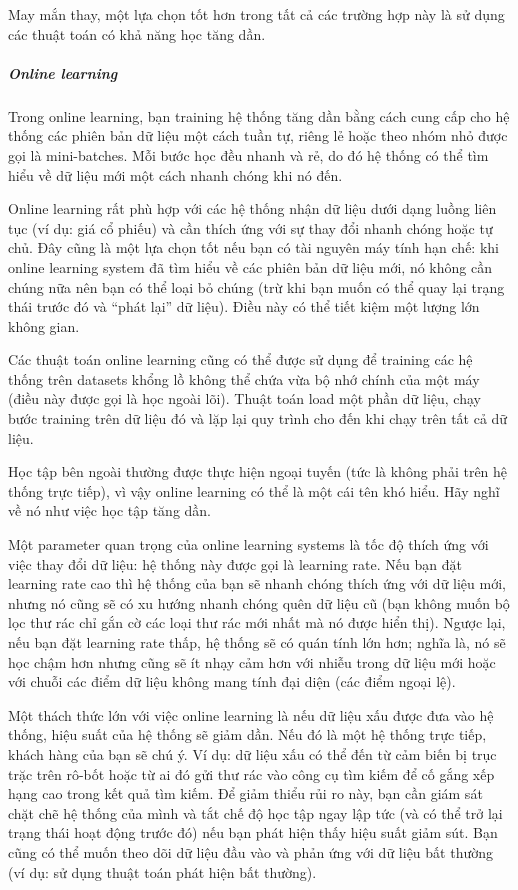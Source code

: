 May mắn thay, một lựa chọn tốt hơn trong tất cả các trường hợp này là sử dụng các thuật toán có khả năng học tăng dần.

\subparagraph{Online learning}

Trong online learning, bạn training hệ thống tăng dần bằng cách cung cấp cho hệ thống các phiên bản dữ liệu một cách tuần tự, riêng lẻ hoặc theo nhóm nhỏ được gọi là mini-batches. Mỗi bước học đều nhanh và rẻ, do đó hệ thống có thể tìm hiểu về dữ liệu mới một cách nhanh chóng khi nó đến.

Online learning rất phù hợp với các hệ thống nhận dữ liệu dưới dạng luồng liên tục (ví dụ: giá cổ phiếu) và cần thích ứng với sự thay đổi nhanh chóng hoặc tự chủ. Đây cũng là một lựa chọn tốt nếu bạn có tài nguyên máy tính hạn chế: khi online learning system đã tìm hiểu về các phiên bản dữ liệu mới, nó không cần chúng nữa nên bạn có thể loại bỏ chúng (trừ khi bạn muốn có thể quay lại trạng thái trước đó và “phát lại” dữ liệu). Điều này có thể tiết kiệm một lượng lớn không gian.

Các thuật toán online learning cũng có thể được sử dụng để training các hệ thống trên datasets khổng lồ không thể chứa vừa bộ nhớ chính của một máy (điều này được gọi là học ngoài lõi). Thuật toán load một phần dữ liệu, chạy bước training trên dữ liệu đó và lặp lại quy trình cho đến khi chạy trên tất cả dữ liệu.

Học tập bên ngoài thường được thực hiện ngoại tuyến (tức là không phải trên hệ thống trực tiếp), vì vậy online learning có thể là một cái tên khó hiểu. Hãy nghĩ về nó như việc học tập tăng dần.

Một parameter quan trọng của online learning systems là tốc độ thích ứng với việc thay đổi dữ liệu: hệ thống này được gọi là learning rate. Nếu bạn đặt learning rate cao thì hệ thống của bạn sẽ nhanh chóng thích ứng với dữ liệu mới, nhưng nó cũng sẽ có xu hướng nhanh chóng quên dữ liệu cũ (bạn không muốn bộ lọc thư rác chỉ gắn cờ các loại thư rác mới nhất mà nó được hiển thị). Ngược lại, nếu bạn đặt learning rate thấp, hệ thống sẽ có quán tính lớn hơn; nghĩa là, nó sẽ học chậm hơn nhưng cũng sẽ ít nhạy cảm hơn với nhiễu trong dữ liệu mới hoặc với chuỗi các điểm dữ liệu không mang tính đại diện (các điểm ngoại lệ).

Một thách thức lớn với việc online learning là nếu dữ liệu xấu được đưa vào hệ thống, hiệu suất của hệ thống sẽ giảm dần. Nếu đó là một hệ thống trực tiếp, khách hàng của bạn sẽ chú ý. Ví dụ: dữ liệu xấu có thể đến từ cảm biến bị trục trặc trên rô-bốt hoặc từ ai đó gửi thư rác vào công cụ tìm kiếm để cố gắng xếp hạng cao trong kết quả tìm kiếm. Để giảm thiểu rủi ro này, bạn cần giám sát chặt chẽ hệ thống của mình và tắt chế độ học tập ngay lập tức (và có thể trở lại trạng thái hoạt động trước đó) nếu bạn phát hiện thấy hiệu suất giảm sút. Bạn cũng có thể muốn theo dõi dữ liệu đầu vào và phản ứng với dữ liệu bất thường (ví dụ: sử dụng thuật toán phát hiện bất thường).

